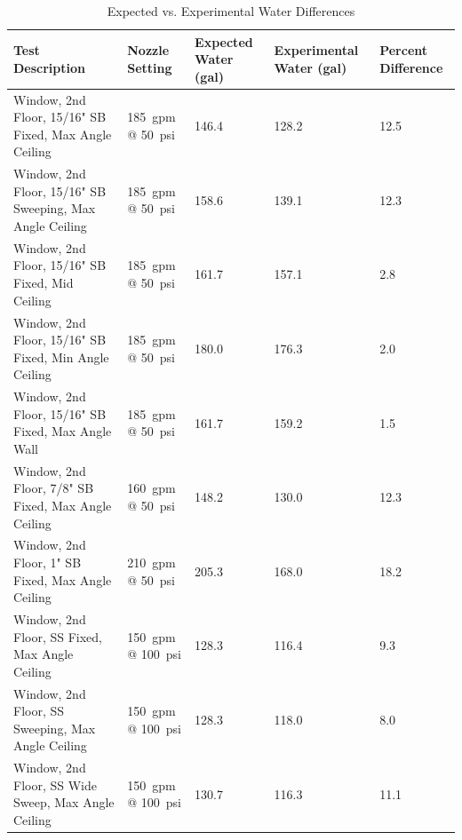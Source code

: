 \documentclass[12pt,oneside]{book}
\begin{document}
\begin{table}[!ht]
\tiny
\centering
\caption{Expected vs. Experimental Water Differences}
\label{Expected_vs._Experimental_Water_Differences}
\begin{tabular}{lllll}
\toprule[1.5pt]
Test Description                                      & Nozzle Setting                 & Expected Water (gal)              & Experimental Water (gal)           & Percent Difference     	\\
\midrule
Window, 2nd Floor, 15/16" SB Fixed, Max Angle Ceiling    & 185~gpm @ 50~psi               & 146.4                             & 128.2                              & 12.5                   \\
Window, 2nd Floor, 15/16" SB Sweeping, Max Angle Ceiling & 185~gpm @ 50~psi               & 158.6                             & 139.1                              & 12.3                   \\
Window, 2nd Floor, 15/16" SB Fixed, Mid Ceiling          & 185~gpm @ 50~psi               & 161.7                             & 157.1                              & 2.8                    \\
Window, 2nd Floor, 15/16" SB Fixed, Min Angle Ceiling    & 185~gpm @ 50~psi               & 180.0                             & 176.3                              & 2.0                    \\
Window, 2nd Floor, 15/16" SB Fixed, Max Angle Wall       & 185~gpm @ 50~psi               & 161.7                             & 159.2                              & 1.5                    \\
Window, 2nd Floor, 7/8" SB Fixed, Max Angle Ceiling      & 160~gpm @ 50~psi               & 148.2                             & 130.0                              & 12.3                   \\
Window, 2nd Floor, 1" SB Fixed, Max Angle Ceiling        & 210~gpm @ 50~psi               & 205.3                             & 168.0                              & 18.2                   \\
Window, 2nd Floor, SS Fixed, Max Angle Ceiling           & 150~gpm @ 100~psi              & 128.3                             & 116.4                              & 9.3                    \\
Window, 2nd Floor, SS Sweeping, Max Angle Ceiling        & 150~gpm @ 100~psi              & 128.3                             & 118.0                              & 8.0                    \\
Window, 2nd Floor, SS Wide Sweep, Max Angle Ceiling      & 150~gpm @ 100~psi              & 130.7                             & 116.3                              & 11.1                   \\

\end{tabular}
\end{table}
\end{document}
